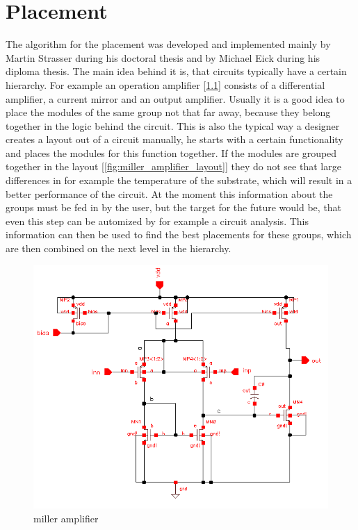 \chapter{Placement}
The algorithm for the placement was developed and implemented mainly by Martin Strasser during his doctoral thesis and by Michael Eick during his diploma thesis. The main idea behind it is, that circuits typically have a certain hierarchy. For example an operation amplifier [\ref{fig:miller_amplifier_schematic}] consists of a differential amplifier, a current mirror and an output amplifier. Usually it is a good idea to place the modules of the same group not that far away, because they belong together in the logic behind the circuit. This is also the typical way a designer creates a layout out of a circuit manually, he starts with a certain functionality and places the modules for this function together. If the modules are grouped together in the layout [\ref{fig:miller_amplifier_layout}] they do not see that large differences in for example the temperature of the substrate, which will result in a better performance of the circuit.
At the moment this information about the groups must be fed in by the user, but the target for the future would be, that even this step can be automized by for example a circuit analysis. This information can then be used to find the best placements for these groups, which are then combined on the next level in the hierarchy.

\begin{figure}
	\centering
	\includegraphics[scale=0.6]{FIG/miller_amplifier_schematic.png}
	\caption{miller amplifier}
	\label{fig:miller_amplifier_schematic}
\end{figure}

